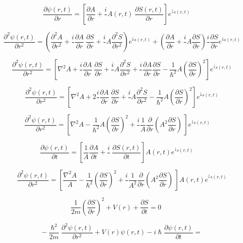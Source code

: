 \documentclass[]{article}
\begin{document}
\[\frac{\partial\psi(r,t)}{\partial r} = \left\lbrack \frac{\partial A}{\partial r} + \frac{i}{}A(r,t)\mathbf{\ }\frac{\partial S(r,t)}{\partial r} \right\rbrack e^{\frac{i}{}s(r,t)}\ \ \ \ \ \ \ \]

\[\frac{\partial^{2}\psi(r,t)}{\partial r^{2}} = \left( \frac{\partial^{2}A}{\partial r^{2}} + \frac{i}{}\frac{\partial A}{\partial r}\mathbf{\ }\frac{\partial S}{\partial r} + \frac{i}{}A\frac{\partial^{2}S}{\partial r^{2}} \right)e^{\frac{i}{}s(r,t)} + \left( \frac{\partial A}{\partial r} + \frac{i}{}A\frac{\partial S}{\partial r} \right)\frac{i}{}\frac{\partial S}{\partial r}e^{\frac{i}{}s(r,t)}\]

\[\frac{\partial^{2}\psi(r,t)}{\partial r^{2}} = \left\lbrack \nabla^{2}A + \frac{i}{}\frac{\partial A}{\partial r}\mathbf{\ }\frac{\partial S}{\partial r} + \frac{i}{}A\frac{\partial^{2}S}{\partial r^{2}} + \frac{i}{}\frac{\partial A}{\partial r}\frac{\partial S}{\partial r} - \frac{1}{\hslash^{2}}A\left( \frac{\partial S}{\partial r} \right)^{2} \right\rbrack e^{\frac{i}{}s(r,t)}\]

\[\frac{\partial^{2}\psi(r,t)}{\partial r^{2}} = \left\lbrack \nabla^{2}A + 2\frac{i}{}\frac{\partial A}{\partial r}\mathbf{\ }\frac{\partial S}{\partial r} + \frac{i}{}A\frac{\partial^{2}S}{\partial r^{2}} - \frac{1}{\hslash^{2}}A\left( \frac{\partial S}{\partial r} \right)^{2} \right\rbrack e^{\frac{i}{}s(r,t)}\]

\[\frac{\partial^{2}\psi(r,t)}{\partial r^{2}} = \left\lbrack \nabla^{2}A - \frac{1}{\hslash^{2}}A\left( \frac{\partial S}{\partial r} \right)^{2} + \frac{i}{}\frac{1}{A}\frac{\partial}{\partial r}\left( A^{2}\frac{\partial S}{\partial r} \right)\mathbf{\ } \right\rbrack e^{\frac{i}{}s(r,t)}\ \ \ \ \ \ \]

\[\frac{\partial\psi(r,t)}{\partial t} = \left\lbrack \frac{1}{A}\frac{\partial A}{\partial t} + \frac{i}{}\mathbf{\ }\frac{\partial S(r,t)}{\partial t} \right\rbrack A(r,t)e^{\frac{i}{}s(r,t)}\ \ \ \ \ \ \ \]

\[\frac{\partial^{2}\psi(r,t)}{\partial r^{2}} = \left\lbrack \frac{\nabla^{2}A}{A} - \frac{1}{\hslash^{2}}\left( \frac{\partial S}{\partial r} \right)^{2} + \frac{i}{}\frac{1}{A^{2}}\frac{\partial}{\partial r}\left( A^{2}\frac{\partial S}{\partial r} \right)\mathbf{\ } \right\rbrack{A(r,t)e}^{\frac{i}{}s(r,t)}\]

\[\frac{1}{2m}\left( \frac{\partial S}{\partial r} \right)^{2} + V(r) + \frac{\partial S}{\partial t} = 0\ \ \ \ \ \ \ \ \]

\[- \frac{\hslash^{2}}{2m}\frac{\partial^{2}\psi(r,t)}{\partial r^{2}} + V(r)\psi(r,t) - i\hslash\frac{\partial\psi(r,t)}{\partial t} =\]
\end{document}
